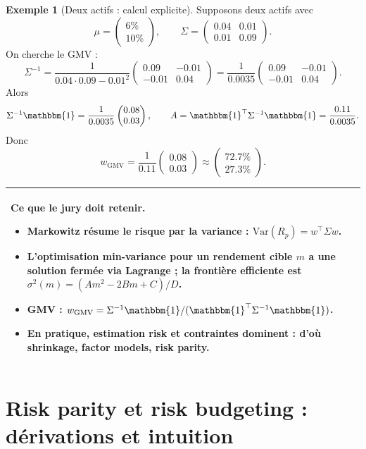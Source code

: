 \documentclass[11pt,a4paper]{report}
\newcommand{\Var}{\mathrm{Var}}
\newcommand{\1}{\mathbbm{1}}
\theoremstyle{definition}
\newtheorem{example}{Exemple}[chapter]
\theoremstyle{plain}
\theoremstyle{remark}
\newenvironment{jurybox}{%
  \begin{center}
  \setlength{\tabcolsep}{6pt}%
  \renewcommand{\arraystretch}{1.1}%
  \begin{tabular}{|p{0.94\textwidth}|}
  \hline
  \small\textbf{Ce que le jury doit retenir.}\par\medskip
}{%
  \\ \hline
  \end{tabular}
  \end{center}
}
\begin{document}
\begin{example}[Deux actifs : calcul explicite]
Supposons deux actifs avec
\[
\mu=
\begin{pmatrix}
6\%\\ 10\%
\end{pmatrix},
\qquad
\Sigma=
\begin{pmatrix}
0.04 & 0.01\\
0.01 & 0.09
\end{pmatrix}.
\]
On cherche le GMV :
\[
\Sigma^{-1}=
\frac{1}{0.04\cdot 0.09-0.01^2}
\begin{pmatrix}
0.09 & -0.01\\
-0.01 & 0.04
\end{pmatrix}
=
\frac{1}{0.0035}
\begin{pmatrix}
0.09 & -0.01\\
-0.01 & 0.04
\end{pmatrix}.
\]
Alors
\[
\Sigma^{-1}\1 = \frac{1}{0.0035}\begin{pmatrix}0.08\\0.03\end{pmatrix},
\qquad
A=\1^\top \Sigma^{-1}\1 = \frac{0.11}{0.0035}.
\]
Donc
\[
w_{\mathrm{GMV}}=\frac{1}{0.11}\begin{pmatrix}0.08\\0.03\end{pmatrix}\approx \begin{pmatrix}72.7\%\\27.3\%\end{pmatrix}.
\]
\end{example}

\begin{jurybox}
\begin{itemize}
\item Markowitz résume le risque par la variance : $\Var(R_p)=w^\top\Sigma w$.
\item L'optimisation min-variance pour un rendement cible $m$ a une solution fermée via Lagrange ; la frontière efficiente est $\sigma^2(m)=(A m^2-2Bm+C)/D$.
\item GMV : $w_{\mathrm{GMV}}=\Sigma^{-1}\1/(\1^\top\Sigma^{-1}\1)$.
\item En pratique, estimation risk et contraintes dominent : d'où shrinkage, factor models, risk parity.
\end{itemize}
\end{jurybox}

\chapter{Risk parity et risk budgeting : dérivations et intuition}
\label{chap:risk_parity}
\end{document}
